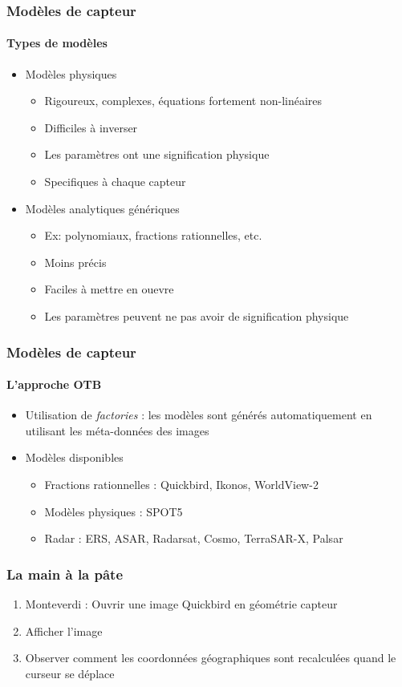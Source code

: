\documentclass[compress]{beamer}
\begin{document}
\begin{frame}
  \frametitle{Modèles de capteur}

  \framesubtitle{Types de modèles}
  \begin{itemize}
    \item Modèles physiques
      \begin{itemize}
	\item Rigoureux, complexes, équations fortement non-linéaires
	\item Difficiles à inverser
	\item Les paramètres ont une signification physique
	\item Specifiques à chaque capteur
      \end{itemize}
    \item Modèles analytiques génériques
      \begin{itemize}
	\item Ex: polynomiaux, fractions rationnelles, etc.
	\item Moins précis
	\item Faciles à mettre en ouevre
	\item Les paramètres peuvent ne pas avoir de signification physique
      \end{itemize}
  \end{itemize}

\end{frame}

\begin{frame}
  \frametitle{Modèles de capteur}

  \framesubtitle{L'approche OTB}
  \begin{itemize}
    \item Utilisation de {\em factories} : les modèles sont générés
      automatiquement en utilisant les méta-données des images
    \item Modèles disponibles
      \begin{itemize}
	\item Fractions rationnelles : Quickbird, Ikonos, WorldView-2
	\item Modèles physiques : SPOT5
	\item Radar : ERS, ASAR, Radarsat, Cosmo, TerraSAR-X, Palsar
      \end{itemize}
  \end{itemize}
\end{frame}


\begin{frame}
\frametitle{La main à la pâte}
\begin{enumerate}
\item Monteverdi : Ouvrir une image Quickbird en géométrie capteur
\item Afficher l'image
\item Observer comment les coordonnées géographiques sont recalculées
  quand le curseur se déplace
\end{enumerate}
\end{frame}
\end{document}
